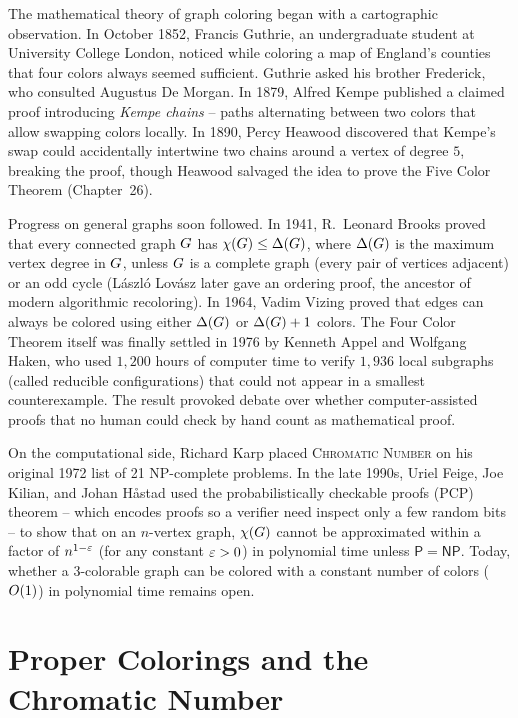 \begin{historybox}
The mathematical theory of graph coloring began with a cartographic observation. In October 1852,
Francis Guthrie, an undergraduate student at University College London, noticed while coloring
a map of England's counties that four colors always seemed sufficient. Guthrie asked his brother
Frederick, who consulted Augustus De Morgan. In 1879, Alfred Kempe published a claimed proof
introducing \emph{Kempe chains} -- paths alternating between two colors that allow swapping
colors locally. In 1890, Percy Heawood discovered that Kempe's swap could accidentally intertwine
two chains around a vertex of degree $5$, breaking the proof, though Heawood salvaged the
idea to prove the Five Color Theorem (Chapter~26).

Progress on general graphs soon followed. In 1941, R.~Leonard Brooks proved that every connected
graph $G$ has $\chi(G) \le \Delta(G)$, where $\Delta(G)$ is the maximum vertex degree in $G$, unless $G$ is a complete graph (every pair of vertices adjacent) or an odd cycle (L{\'a}szl{\'o} Lov{\'a}sz
later gave an ordering proof, the ancestor of modern algorithmic recoloring). In 1964,
Vadim Vizing proved that edges can always be colored using either $\Delta(G)$ or $\Delta(G)+1$ colors.
The Four Color Theorem itself was finally settled in 1976 by Kenneth Appel and Wolfgang Haken,
who used $1{,}200$ hours of computer time to verify $1{,}936$ local subgraphs (called reducible configurations) that could not appear in a smallest counterexample. The result
provoked debate over whether computer-assisted proofs that no human could
check by hand count as mathematical proof.

On the computational side, Richard Karp placed \textsc{Chromatic Number} on his original 1972
list of 21 NP-complete problems. In the late 1990s, Uriel Feige, Joe Kilian, and Johan H{\aa}stad
used the probabilistically checkable proofs (PCP) theorem -- which encodes proofs so a verifier need inspect only a few random bits -- to show that on an $n$-vertex graph, $\chi(G)$ cannot be approximated within a factor of $n^{1-\varepsilon}$ (for any constant $\varepsilon>0$) in polynomial
time unless $\mathsf{P}=\mathsf{NP}$. Today, whether a $3$-colorable graph can be colored with a constant number of colors ($O(1)$)
in polynomial time remains open.
\end{historybox}

\chapterline

\section{Proper Colorings and the Chromatic Number}
\label{ch28:basics}

